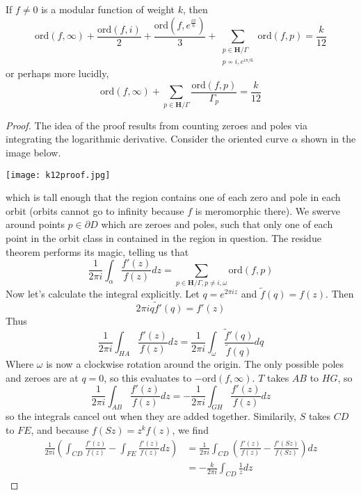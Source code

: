 \begin{theorem}
    If $f \neq 0$ is a modular function of weight $k$, then
    \[ \text{ord}(f,\infty) + \frac{\text{ord}(f,i)}{2} + \frac{\text{ord}(f,e^{\frac{i \pi}{6}})}{3} + \sum_{\substack{p \in \mathbf{H}/\Gamma\\p \not \sim i, e^{i \pi/6}}} \text{ord}(f,p) = \frac{k}{12} \]
    or perhaps more lucidly,
    \[ \text{ord}(f,\infty) + \sum_{p \in \mathbf{H}/\Gamma} \frac{\text{ord}(f,p)}{\Gamma_p} = \frac{k}{12} \]
\end{theorem}
\begin{proof}
    The idea of the proof results from counting zeroes and poles via integrating the logarithmic derivative. Consider the oriented curve $\alpha$ shown in the image below.
    \begin{center}
    \texttt{[image: k12proof.jpg]}
    \end{center}
    which is tall enough that the region contains one of each zero and pole in each orbit (orbits cannot go to infinity because $f$ is meromorphic there). We swerve around points $p \in \partial D$ which are zeroes and poles, such that only one of each point in the orbit class in contained in the region in question. The residue theorem performs its magic, telling us that
    \[ \frac{1}{2\pi i} \int_\alpha \frac{f'(z)}{f(z)} dz = \sum_{p \in \mathbf{H}/\Gamma, p \neq i, \omega} \text{ord}(f,p) \]
    Now let's calculate the integral explicitly. Let $q = e^{2 \pi i z}$ and $\tilde{f}(q) = f(z)$. Then
    \[ 2 \pi i q \tilde{f}'(q) = f'(z)  \]
    Thus
    \[ \frac{1}{2 \pi i} \int_{HA} \frac{f'(z)}{f(z)} dz = \frac{1}{2 \pi i} \int_{\omega} \frac{\tilde{f}'(q)}{\tilde{f}(q)} dq \]
    Where $\omega$ is now a clockwise rotation around the origin. The only possible poles and zeroes are at $q = 0$, so this evaluates to $- \text{ord}(f,\infty)$. $T$ takes $AB$ to $HG$, so
    \[ \frac{1}{2 \pi i} \int_{AB} \frac{f'(z)}{f(z)} dz = - \frac{1}{2 \pi i} \int_{GH} \frac{f'(z)}{f(z)} dz \]
    so the integrals cancel out when they are added together. Similarily, $S$ takes $CD$ to $FE$, and because $f(Sz) = z^k f(z)$, we find
    \begin{align*}
        \frac{1}{2 \pi i} \left( \int_{CD} \frac{f'(z)}{f(z)} - \int_{FE} \frac{f'(z)}{f(z)} dz \right) &= \frac{1}{2 \pi i} \int_{CD} \left( \frac{f'(z)}{f(z)} - \frac{f'(Sz)}{f(Sz)} \right) dz\\
        &= -\frac{k}{2 \pi i} \int_{CD} \frac{1}{z} dz

\end{align*}
\end{proof}
